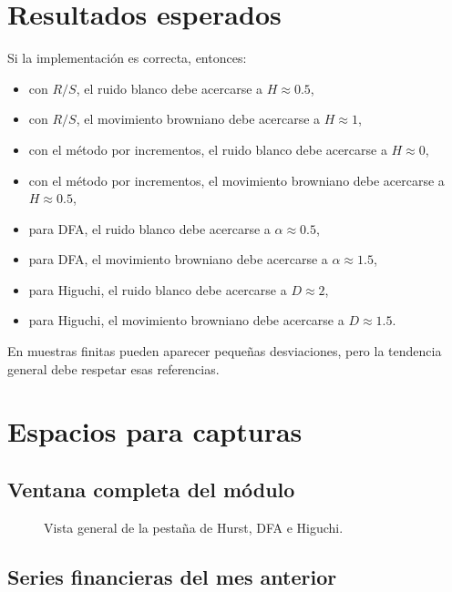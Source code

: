 \documentclass[12pt,a4paper]{article}
\begin{document}
\section{Resultados esperados}

Si la implementación es correcta, entonces:

\begin{itemize}
    \item con \(R/S\), el ruido blanco debe acercarse a \(H \approx 0.5\),
    \item con \(R/S\), el movimiento browniano debe acercarse a \(H \approx 1\),
    \item con el método por incrementos, el ruido blanco debe acercarse a \(H \approx 0\),
    \item con el método por incrementos, el movimiento browniano debe acercarse a \(H \approx 0.5\),
    \item para DFA, el ruido blanco debe acercarse a \(\alpha \approx 0.5\),
    \item para DFA, el movimiento browniano debe acercarse a \(\alpha \approx 1.5\),
    \item para Higuchi, el ruido blanco debe acercarse a \(D \approx 2\),
    \item para Higuchi, el movimiento browniano debe acercarse a \(D \approx 1.5\).
\end{itemize}

En muestras finitas pueden aparecer pequeñas desviaciones, pero la tendencia general debe respetar esas referencias.

\section{Espacios para capturas}

\subsection{Ventana completa del módulo}

\begin{figure}[H]
    \centering
    \fbox{\rule{0pt}{7cm}\rule{0.9\linewidth}{0pt}}
    \caption{Vista general de la pestaña de Hurst, DFA e Higuchi.}
\end{figure}

\subsection{Series financieras del mes anterior}
\end{document}
